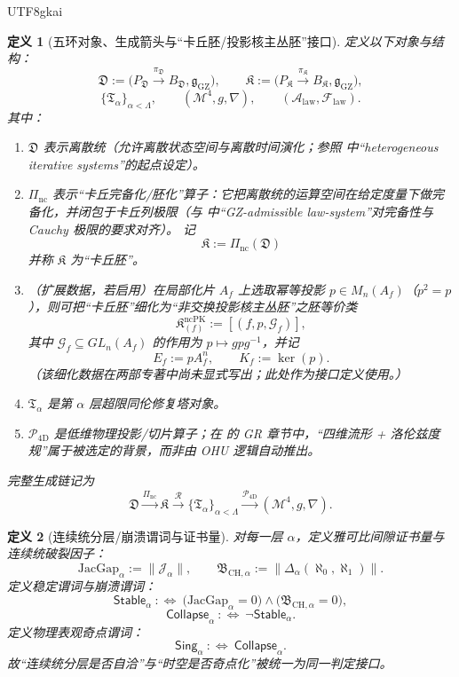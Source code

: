 \documentclass[12pt]{article}
\newtheorem{definition}{定义}[section]
\begin{document}
\begin{CJK*}{UTF8}{gkai}
\begin{definition}[五环对象、生成箭头与“卡丘胚/投影核主丛胚”接口]
\label{def:tex29-chain5-objects}
定义以下对象与结构：
\[
  \mathfrak{D}:=\bigl(P_{\mathfrak D}\xrightarrow{\pi_{\mathfrak D}}B_{\mathfrak D},\mathfrak{g}_{\mathrm{GZ}}\bigr),
  \qquad
  \mathfrak{K}:=\bigl(P_{\mathfrak K}\xrightarrow{\pi_{\mathfrak K}}B_{\mathfrak K},\mathfrak{g}_{\mathrm{GZ}}\bigr),
\]
\[
  \{\mathfrak{T}_{\alpha}\}_{\alpha<\Lambda},
  \qquad
  (\mathcal{M}^{4},g,\nabla),
  \qquad
  (\mathcal{A}_{\mathrm{law}},\mathcal{F}_{\mathrm{law}}).
\]
其中：
\begin{enumerate}
  \item $\mathfrak{D}$ 表示离散统（允许离散状态空间与离散时间演化；参照 \cite{GaoZheng2025GFramework} 中“heterogeneous iterative systems”的起点设定）。
  \item $\Pi_{\mathrm{nc}}$ 表示“卡丘完备化/胚化”算子：它把离散统的运算空间在给定度量下做完备化，并闭包于卡丘列极限（与 \cite{GaoZheng2025GFramework}
    中“GZ-admissible law-system”对完备性与 Cauchy 极限的要求对齐）。
        记
        \[
          \mathfrak{K}:=\Pi_{\mathrm{nc}}(\mathfrak{D})
        \]
        并称 $\mathfrak{K}$ 为“卡丘胚”。
  \item （扩展数据，若启用）在局部化片 $A_f$ 上选取幂等投影 $p\in M_n(A_f)$（$p^2=p$），则可把“卡丘胚”细化为“非交换投影核主丛胚”之胚等价类
        \[
          \mathfrak{K}_{(f)}^{\mathrm{ncPK}} := [(f,p,\mathcal{G}_f)],
        \]
        其中 $\mathcal{G}_f\subseteq GL_n(A_f)$ 的作用为 $p\mapsto gpg^{-1}$，并记
        \[
          E_f:=pA_f^n,\qquad K_f:=\ker(p).
        \]
        （该细化数据在两部专著中尚未显式写出；此处作为接口定义使用。）
  \item $\mathfrak{T}_{\alpha}$ 是第 $\alpha$ 层超限同伦修复塔对象。
  \item $\mathcal{P}_{\mathrm{4D}}$ 是低维物理投影/切片算子；在 \cite{GaoZhengAppVol1} 的 GR 章节中，“四维流形 + 洛伦兹度规”属于被选定的背景，而非由 OHU 逻辑自动推出。

\end{enumerate}
完整生成链记为
\[
  \mathfrak{D}
  \xrightarrow{\Pi_{\mathrm{nc}}}
  \mathfrak{K}
  \xrightarrow{\mathcal{R}}
  \{\mathfrak{T}_{\alpha}\}_{\alpha<\Lambda}
  \xrightarrow{\mathcal{P}_{\mathrm{4D}}}
  (\mathcal{M}^{4},g,\nabla).
\]
\end{definition}

\begin{definition}[连续统分层/崩溃谓词与证书量]
\label{def:tex29-chain5-predicates}
对每一层 $\alpha$，定义雅可比间隙证书量与连续统破裂因子：
\[
  \mathrm{JacGap}_{\alpha}:=\lVert \mathcal{J}_{\alpha} \rVert,
  \qquad
  \mathfrak{B}_{\mathrm{CH},\alpha}:=\lVert \Delta_{\alpha}(\aleph_0,\aleph_1) \rVert.
\]
定义稳定谓词与崩溃谓词：
\[
  \mathsf{Stable}_{\alpha}\ :\Longleftrightarrow\
  \bigl(\mathrm{JacGap}_{\alpha}=0\bigr)\wedge\bigl(\mathfrak{B}_{\mathrm{CH},\alpha}=0\bigr),
\]
\[
  \mathsf{Collapse}_{\alpha}\ :\Longleftrightarrow\ \neg \mathsf{Stable}_{\alpha}.
\]
定义物理表观奇点谓词：
\[
  \mathsf{Sing}_{\alpha}\ :\Longleftrightarrow\ \mathsf{Collapse}_{\alpha}.
\]
故“连续统分层是否自洽”与“时空是否奇点化”被统一为同一判定接口。
\end{definition}


\end{CJK*}
\end{document}
